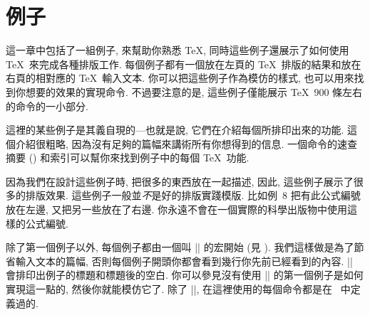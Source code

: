 

\chapter{例子}



這一章中包括了一組例子, 來幫助你熟悉 \TeX, 同時這些例子還展示了如何使用 \TeX\ 來完成各種排版工作.
每個例子都有一個放在左頁的 \TeX\ 排版的結果和放在右頁的相對應的 \TeX\ 輸入文本.
你可以把這些例子作為模仿的樣式, 也可以用來找到你想要的效果的實現命令.
不過要注意的是, 這些例子僅能展示 \TeX\ $900$ 條左右的命令的一小部分.

這裡的某些例子是其義自現的---也就是說, 它們在介紹每個所排印出來的功能.
這個介紹很粗略, 因為沒有足夠的篇幅來講術所有你想得到的信息.
一個命令的速查摘要 () 和索引可以幫你來找到例子中的每個 \TeX\ 功能.

因為我們在設計這些例子時, 把很多的東西放在一起描述,
因此, 這些例子展示了很多的排版效果.
這些例子一般並\emph{不}是好的排版實踐模版.
比如例~8 把有此公式編號放在左邊, 又把另一些放在了右邊.
你永遠不會在一個實際的科學出版物中使用這樣的公式編號.

除了第一個例子以外, 每個例子都由一個叫 |\xmpheader| 的宏開始 (見 ).
我們這樣做是為了節省輸入文本的篇幅, 
否則每個例子開頭你都會看到幾行你先前已經看到的內容.
|\xmpheader| 會排印出例子的標題和標題後的空白.
你可以參見沒有使用 |\xmpheader| 的第一個例子是如何實現這一點的,
然後你就能模仿它了.
除了 |\xmpheader|, 在這裡使用的每個命令都是在 \plainTeX\ 中定義過的.

{%
   \let\bye = \relax %
}%


\endchapter
\byebye
